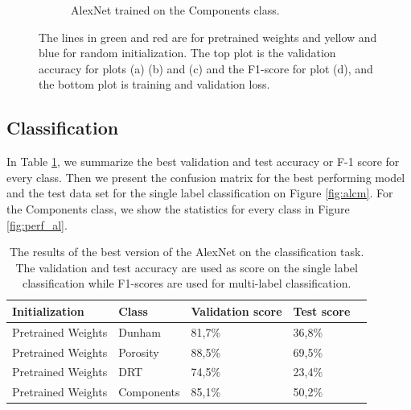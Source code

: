 \begin{figure}
{\begin{subfigure}[b]{.6\textwidth}
\label{fig:alexinit_comp}
\caption{AlexNet trained on the Components class.}
\end{subfigure}%
}
\caption[Training and validation plots for AlexNet]{The lines in green and red are for pretrained weights and yellow and blue for random initialization. The top plot is the validation accuracy for plots (a) (b) and (c) and the F1-score for plot (d), and the bottom plot is training  and validation loss.}
\label{fig:plotsalex}
\end{figure}


\subsection{Classification}
In Table \ref{tab:alexbest}, we summarize the best validation and test accuracy or F-1 score for every class. Then we present the confusion matrix for the best performing model and the test data set for the single label classification on Figure \ref{fig:alcm}. For the Components class, we show the statistics for every class in Figure \ref{fig:perf_al}. 

\begin{table}
\caption{\label{tab:alexbest} The results of the best version of the AlexNet on the classification task. The validation and test accuracy are used as score on the single label classification while F1-scores are used for multi-label classification.}
\centering
\begin{tabular}[b]{| l | l | l | l | l |}
\hline
    Initialization & Class & Validation score & Test score  \\ \hline
    Pretrained Weights & Dunham &  81,7\%  & 36,8\% \\ \hline
    Pretrained Weights & Porosity & 88,5\%  &  69,5\% \\ \hline
    Pretrained Weights &DRT & 74,5\% &  23,4\% \\ \hline
    Pretrained Weights &Components & 85,1\% &  50,2\% \\ \hline
\end{tabular} 
\end{table}

